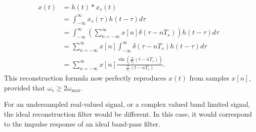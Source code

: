 \begin{align}
 x(t) &= h(t)*x_s(t)\\
 &= \int_{-\infty}^{\infty} x_s(\tau)h(t-\tau)d\tau\\
 &= \int_{-\infty}^{\infty}\left( \sum_{n=-\infty}^{\infty} x[n] \delta(\tau-n T_s)\right) h(t-\tau) d\tau \\
&= \sum_{n=-\infty}^{\infty} x[n] \int_{-\infty}^{\infty} \delta(\tau-nT_s) h(t-\tau)d\tau \\
&= \sum_{n=-\infty}^{\infty} x[n] \frac{\sin(\frac{\pi}{T_s}(t-n T_s))}{\frac{\pi}{T_s}(t-nT_s)}.
\end{align}
This reconstruction formula now perfectly reproduces $x(t)$ from
samples $x[n]$, provided that $\omega_s \ge 2\omega_{\mathrm{max}}$.

For an undersampled real-valued signal, or a complex valued band limited signal, the ideal reconstruction filter would be different. 
In this case, it would correspond to the impulse response of an ideal band-pass filter.
